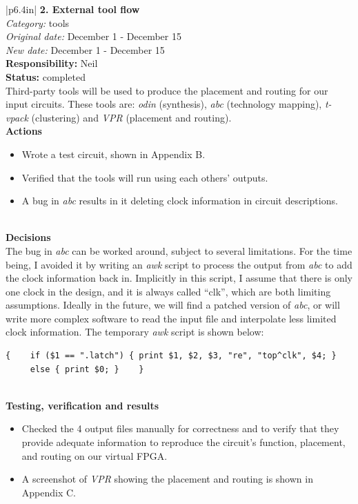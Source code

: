 \documentclass[12pt,letterpaper]{article}
\begin{document}
\begin{tabular}{|p{6.4in}|}
\hline
\textbf{2. External tool flow} \\
\emph{Category:} tools \\
\emph{Original date:} December 1 - December 15 \\
\emph{New date:} December 1 - December 15 \\
\hline
\textbf{Responsibility:} Neil \\
\hline
\textbf{Status:} completed \\
Third-party tools will be used to produce the placement and routing for our input circuits.
These tools are: \emph{odin} (synthesis), \emph{abc} (technology mapping), \emph{t-vpack} (clustering) and \emph{VPR} (placement and routing). \\
\hline
\textbf{Actions} \\
\vspace{-1em}
\begin{itemize}
\item Wrote a test circuit, shown in Appendix B.
\item Verified that the tools will run using each others' outputs.
\item A bug in \emph{abc} results in it deleting clock information in circuit descriptions.
\end{itemize} 
\vspace{-1em} \\
\hline
\textbf{Decisions} \\
The bug in \emph{abc} can be worked around, subject to several limitations.
For the time being, I avoided it by writing an \emph{awk} script to process the output from \emph{abc} to add the clock information back in.
Implicitly in this script, I assume that there is only one clock in the design, and it is always called ``clk'', which are both limiting assumptions.
Ideally in the future, we will find a patched version of \emph{abc}, or will write more complex software to read the input file and interpolate less limited clock information.
The temporary \emph{awk} script is shown below:
\begin{verbatim}{    if ($1 == ".latch") { print $1, $2, $3, "re", "top^clk", $4; }
     else { print $0; }    }\end{verbatim}
\\ \hline
\textbf{Testing, verification and results} \\
\vspace{-1em}
\begin{itemize}
\item Checked the 4 output files manually for correctness and to verify that they provide adequate information to reproduce the circuit's function, placement, and routing on our virtual FPGA.
\item A screenshot of \emph{VPR} showing the placement and routing is shown in Appendix C.
\end{itemize} 
\vspace{-1em} \\
\hline
\end{tabular}
\end{document}
